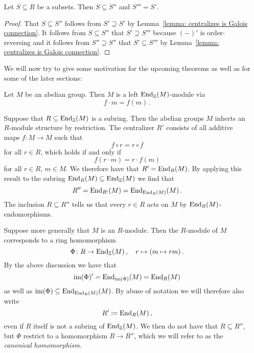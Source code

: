 \begin{corollary}
  Let $S \subseteq R$ be a subsets.
  Then $S \subseteq S''$ and $S''' = S'$.
\end{corollary}


\begin{proof}
  That $S \subseteq S''$ follows from $S' \supseteq S'$ by Lemma~\ref{lemma: centralizes is Galois connection}.
  It follows from $S \subseteq S''$ that $S' \supseteq S'''$ because $(-)'$ is order-reversing and it follows from $S'' \supseteq S''$ that $S' \subseteq S'''$ by Lemma~\ref{lemma: centralizes is Galois connection}.
\end{proof}


\begin{fluff}
  We will now try to give some motivation for the upcoming theorems as well as for some of the later sections:
  
  Let $M$ be an abelian group.
  Then $M$ is a left $\operatorname{End}_{\mathbb{Z}}(M)$-module via
  \[
      f \cdot m
    = f(m) \,.
  \]
  
  Suppose that $R \subseteq \operatorname{End}_{\mathbb{Z}}(M)$ is a subring.
  Then the abelian groups $M$ inherts an $R$-module structure by restriction.
  The centralizer $R'$ consists of all additive maps $f \colon M \to M$ such that
  \[
    f \circ r = r \circ f
  \]
  for all $r \in R$, which holds if and only if
  \[
    f(r \cdot m) = r \cdot f(m)
  \]
  for all $r \in R$, $m \in M$.
  We therefore have that $R' = \operatorname{End}_R(M)$.
  By applying this result to the subring $\operatorname{End}_R(M) \subseteq \operatorname{End}_{\mathbb{Z}}(M)$ we find that
  \[
      R'' 
    = \operatorname{End}_{R'}(M)
    = \operatorname{End}_{\operatorname{End}_R(M)}(M) \,.
  \]
  The inclusion $R \subseteq R''$ tells us that every $r \in R$ acts on $M$ by $\operatorname{End}_R(M)$-endomorphisms.
  
  Suppose more generally that $M$ is an $R$-module.
  Then the $R$-module of $M$ corresponds to a ring homomorphism
  \[
            \Phi
    \colon  R
    \to     \operatorname{End}_{\mathbb{Z}}(M) \,,
    \quad   r
    \mapsto (m \mapsto rm) \,. 
  \]
  By the above discussion we have that
  \[
      \operatorname{im}(\Phi)'
    = \operatorname{End}_{\operatorname{im}(\Phi)}(M)
    = \operatorname{End}_R(M) 
  \]
  as well as $\operatorname{im}(\Phi) \subseteq \operatorname{End}_{\operatorname{End}_R(M)}(M)$.
  By abuse of notation we will therefore also write
  \[
              R'
    \coloneqq  \operatorname{End}_R(M) \,,
  \]
  even if $R$ itself is not a subring of $\operatorname{End}_{\mathbb{Z}}(M)$.
  We then do not have that $R \subseteq R''$, but $\Phi$ restrict to a homomorphism $R \to R''$, which we will refer to as the \emph{canonical homomorphism}.
  

\end{fluff}
